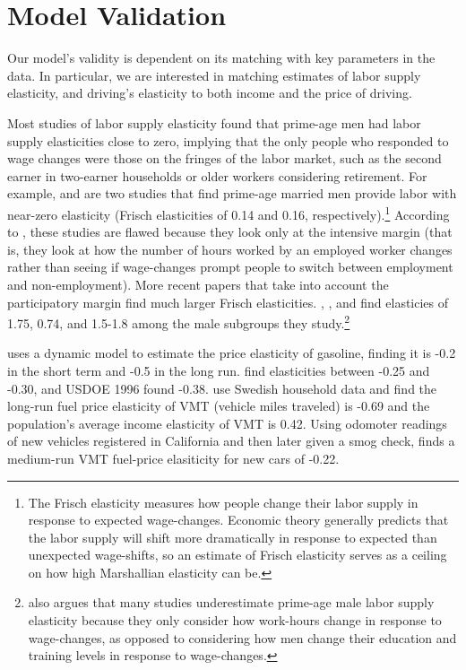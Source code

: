 \documentclass[letter, 12pt, epsf,leqno]{article}
\begin{document}

\section{Model Validation}\label{sec:validation}

Our model's validity is dependent on its matching with key parameters in the data.  In particular, we are interested in matching estimates of labor supply elasticity, and driving's elasticity to both income and the price of driving.

Most studies of labor supply elasticity found that prime-age men had labor supply elasticities close to zero, implying that the only people who responded to wage changes were those on the fringes of the labor market, such as the second earner in two-earner households or older workers considering retirement.  For example, \citet{altug} and \citet{ziliak} are two studies that find prime-age married men provide labor with near-zero elasticity (Frisch elasticities of 0.14 and 0.16, respectively).\footnote
{The Frisch elasticity measures how people change their labor supply in response to expected wage-changes.  Economic theory generally predicts that the labor supply will shift more dramatically in response to expected than unexpected wage-shifts, so an estimate of Frisch elasticity serves as a ceiling on how high Marshallian elasticity can be.} 
According to \citet{keane}, these studies are flawed because they look only at the intensive margin (that is, they look at how the number of hours worked by an employed worker changes rather than seeing if wage-changes prompt people to switch between employment and non-employment). More recent papers that take into account the participatory margin find much larger Frisch elasticities.  \citet{erosa}, \citet{keane_wasi}, and \citet{iskhakov} find elasticies of 1.75, 0.74, and 1.5-1.8 among the male subgroups they study.\footnote
{\citet{keane} also argues that many studies underestimate prime-age male labor supply elasticity because they only consider how work-hours change in response to wage-changes, as opposed to considering how men change their education and training levels in response to wage-changes.}

\citet{wei} uses a dynamic model to estimate the price elasticity of gasoline, finding it is -0.2 in the short term and -0.5 in the long run.  \citet{bento} find elasticities between -0.25 and -0.30, and USDOE 1996 found -0.38.  \cite{berry} use Swedish household data and find the long-run fuel price elasticity of VMT (vehicle miles traveled) is -0.69 and the population's average income elasticity of VMT is 0.42.  Using odomoter readings of new vehicles registered in California and then later given a smog check, \citet{gillingham} finds a medium-run VMT fuel-price elasiticity for new cars of -0.22.%
\end{document}
